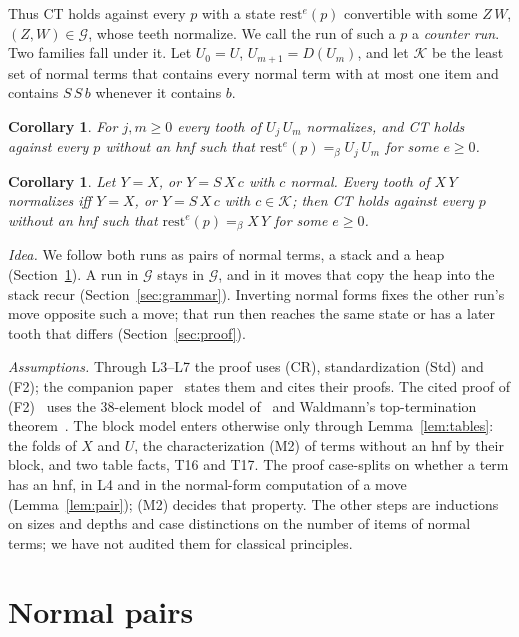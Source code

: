 \documentclass[11pt]{amsart}
\newtheorem{corollary}[theorem]{Corollary}
\theoremstyle{definition}
\newcommand{\conv}{=_\beta}
\newcommand{\rest}{\mathrm{rest}}
\newcommand{\Gc}{\mathcal G}
\newcommand{\Kc}{\mathcal K}
\begin{document}
\noindent Thus CT holds against every $p$ with a state $\rest^e(p)$ convertible with some $Z\,W$,
$(Z,W)\in\Gc$, whose teeth normalize. We call the run of such a $p$ a \emph{counter run}. Two
families fall under it. Let
$U_0=U$, $U_{m+1}=D(U_m)$, and let $\Kc$ be the least set of normal terms that contains every
normal term with at most one item and contains $S\,S\,b$ whenever it contains $b$.

\begin{corollary}\label{cor:U}
For $j,m\ge0$ every tooth of $U_j\,U_m$ normalizes, and CT holds against every $p$ without an hnf
such that $\rest^e(p)\conv U_j\,U_m$ for some $e\ge0$.
\end{corollary}

\begin{corollary}\label{cor:X}
Let $Y=X$, or $Y=S\,X\,c$ with $c$ normal. Every tooth of $X\,Y$ normalizes iff $Y=X$, or
$Y=S\,X\,c$ with $c\in\Kc$;
then CT holds against every $p$ without an hnf such that $\rest^e(p)\conv X\,Y$ for some $e\ge0$.
\end{corollary}

\emph{Idea.} We follow both runs as pairs of normal terms, a stack and a heap
(Section~\ref{sec:pairs}). A run in $\Gc$ stays in $\Gc$, and in it moves that copy the heap into
the stack recur (Section~\ref{sec:grammar}). Inverting normal forms fixes the other run's move
opposite such a move; that run then reaches the same state or has a later tooth that differs
(Section~\ref{sec:proof}).

\emph{Assumptions.} Through L3--L7 the proof uses (CR), standardization (Std) and (F2); the
companion paper~\citep{s11} states them and cites their proofs. The cited proof of (F2)~\citep{s1,s3} uses the 38-element block
model of~\citep{s1} and Waldmann's top-termination theorem~\citep[Theorem~3]{s3}. The block model
enters otherwise only through Lemma~\ref{lem:tables}: the folds of $X$ and $U$, the
characterization (M2) of terms without an hnf by their block, and two table facts, T16 and T17. The
proof case-splits on whether a term has an hnf, in L4 and in the normal-form computation of a move
(Lemma~\ref{lem:pair}); (M2) decides that property. The other steps are inductions on sizes and
depths and case distinctions on the number of items of normal terms; we have not audited them for
classical principles.

\section{Normal pairs}\label{sec:pairs}
\end{document}
